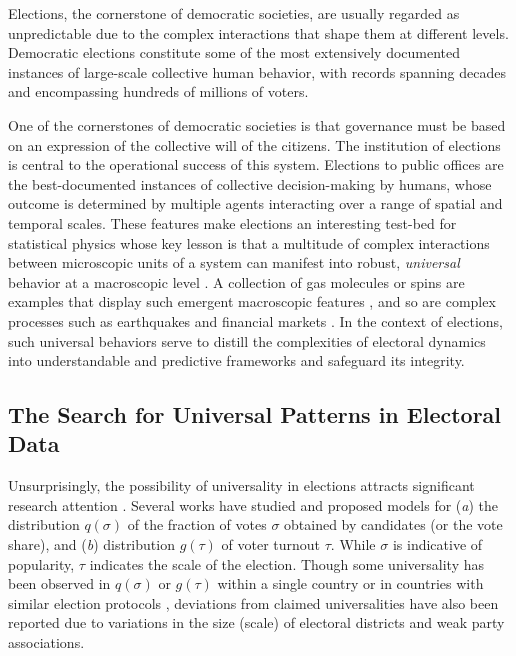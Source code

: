 Elections, the cornerstone of democratic societies, are usually regarded as unpredictable due to the complex interactions that shape them at different levels. Democratic elections constitute some of the most extensively documented instances of large-scale collective human behavior, with records spanning decades and encompassing hundreds of millions of voters.

One of the cornerstones of democratic societies is that governance must be based on an expression of the collective will of the citizens. The institution of elections is central to the operational success of this system. Elections to public offices are the best-documented instances of collective decision-making by humans, whose outcome is determined by multiple agents interacting over a range of spatial and temporal scales. These features make elections an interesting test-bed for statistical physics whose key lesson is that a multitude of complex interactions between microscopic units of a system can manifest into robust, {\it universal} behavior at a macroscopic level \cite{anderson1972more,strogatz2022fifty,CasForLor2009, JedSzn2019, MigTor2020, galam2012, brams2008, ForMacRed2013, Bouchaud2023, SenCha2014, PerJorRan2017,JusHolKan2022,redner2019reality}. A collection of gas molecules or spins are examples that display such emergent macroscopic features \cite{REI65}, and so are complex processes such as earthquakes \cite{Corral2004,Corral2006} and financial markets \cite{PleGopRos1999}. In the context of elections, such universal behaviors serve to distill the complexities of electoral dynamics into understandable and predictive frameworks and safeguard its integrity. 

\subsection{The Search for Universal Patterns in Electoral Data}
Unsurprisingly, the possibility of universality in elections attracts significant research attention \cite{CosAlmAnd1999, ForCas2007, BorBou2010, mantovani2011scaling, BokSzaVat2018, ChaMitFor2013, hosel2019universality}. Several works have studied and proposed models for ({\it a}) the distribution $q(\sigma)$ of the fraction of votes $\sigma$ obtained by candidates (or the vote share), and ({\it b}) distribution $g(\tau)$ of voter turnout $\tau$. While $\sigma$ is indicative of popularity, $\tau$ indicates the scale of the election. Though some universality has been observed in $q(\sigma)$ or $g(\tau)$ within a single country \cite{ForCas2007,CosAlmAnd1999, BorBou2010} or in countries with similar election protocols \cite{ForCas2007, ChaMitFor2013}, deviations from claimed universalities have also been reported \cite{ChaMitFor2013, Kon2017,Kon2019, CalCroAnt2015, BorRayBou2012} due to variations in the size (scale) of electoral districts and weak party associations. 


